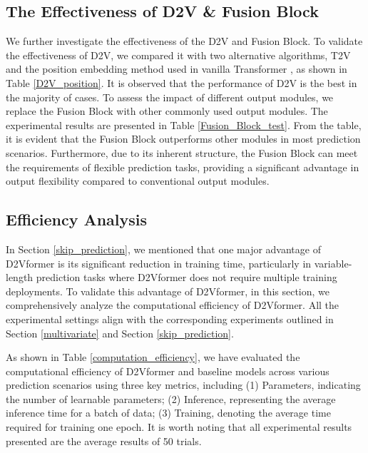 \documentclass{article}
\begin{document}
\subsection{The Effectiveness of D2V \& Fusion Block} 
We further investigate the effectiveness of the D2V and Fusion Block. 
To validate the effectiveness of D2V, we compared it with two alternative algorithms, T2V \cite{t2v_position_1} and the position embedding method used in vanilla Transformer \cite{transformer}, as shown in Table \ref{D2V_position}.
It is observed that the performance of D2V is the best in the majority of cases.
To assess the impact of different output modules, we replace the Fusion Block with other commonly used output modules. The experimental results are presented in Table \ref{Fusion_Block_test}. From the table, it is evident that the Fusion Block outperforms other modules in most prediction scenarios. 
Furthermore, due to its inherent structure, the Fusion Block can meet the requirements of flexible prediction tasks, providing a significant advantage in output flexibility compared to conventional output modules.


\subsection{Efficiency Analysis}







In Section \ref{skip_prediction}, we mentioned that one major advantage of D2Vformer is its significant reduction in training time, particularly in variable-length prediction tasks where D2Vformer does not require multiple training deployments. To validate this advantage of D2Vformer, in this section, we comprehensively analyze the computational efficiency of D2Vformer. All the experimental settings align with the corresponding experiments outlined in Section \ref{multivariate} and Section \ref{skip_prediction}.

As shown in Table \ref{computation_efficiency}, we have evaluated the computational efficiency of D2Vformer and baseline models across various prediction scenarios using three key metrics, including (1) Parameters, indicating the number of learnable parameters; (2) Inference, representing the average inference time for a batch of data; (3) Training, denoting the average time required for training one epoch. It is worth noting that all experimental results presented are the average results of 50 trials.
\end{document}
